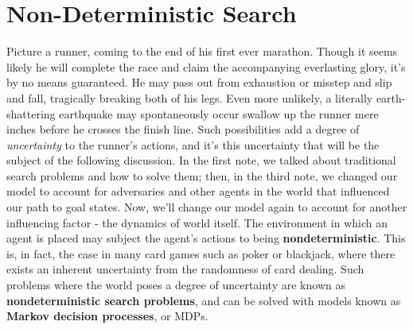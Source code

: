 \documentclass[11pt,fleqn]{article}
\def\title{Note \the\lecturenumber}
\begin{document}
\maketitle

\section*{Non-Deterministic Search}
Picture a runner, coming to the end of his first ever marathon. Though it seems likely he will complete the race and claim the accompanying everlasting glory, it's by no means guaranteed. He may pass out from exhaustion or misstep and slip and fall, tragically breaking both of his legs. Even more unlikely, a literally earth-shattering earthquake may spontaneously occur swallow up the runner mere inches before he crosses the finish line. Such possibilities add a degree of \textit{uncertainty} to the runner's actions, and it's this uncertainty that will be the subject of the following discussion. In the first note, we talked about traditional search problems and how to solve them; then, in the third note, we changed our model to account for adversaries and other agents in the world that influenced our path to goal states. Now, we'll change our model again to account for another influencing factor - the dynamics of world itself. The environment in which an agent is placed may subject the agent's actions to being \textbf{nondeterministic}. This is, in fact, the case in many card games such as poker or blackjack, where there exists an inherent uncertainty from the randomness of card dealing. Such problems where the world poses a degree of uncertainty are known as \textbf{nondeterministic search problems}, and can be solved with models known as \textbf{Markov decision processes}, or MDPs.


\end{document}
\end{document}
